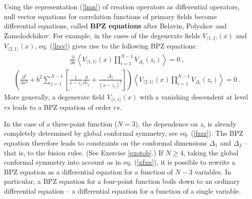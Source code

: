 \documentclass[12pt,a4paper,notitlepage]{report}
\newcommand \la {\left\langle}
\newcommand \ra {\right\rangle}
\newcommand \p {\partial}
\newcommand \pp[1] {{\frac{\p}{\p #1}}}
\numberwithin{equation}{section}
\theoremstyle{break}
\begin{document}
Using the representation (\ref{lmn}) of creation operators as differential operators, null vector equations for correlation functions of primary fields become differential equations, called \textbf{\boldmath BPZ equations} after Belavin, Polyakov and Zamolodchikov. 
For example, in the cases of the degenerate fields $V_{\langle 1,1 \rangle}(x)$ and $V_{\langle 2,1 \rangle}(x)$, eq. (\ref{lrsv}) gives rise to the following BPZ equations: 
\begin{align}
 \pp{x} \la V_{\langle 1,1 \rangle}(x) \prod_{i=1}^{N-1} V_{\Delta_i}(z_i) \ra = 0 \ ,
\label{pvoo} 
\end{align}
\begin{align}
\boxed{\left( \frac{\p^2}{\p x^2}  +b^2 \sum_{j=1}^{N-1} \left[\frac{1}{x-z_j}\pp{z_j}+ \frac{\Delta_j}{(x-z_j)^2} \right]\right)\la V_{\langle 2,1 \rangle}(x) \prod_{i=1}^{N-1} V_{\Delta_i}(z_i) \ra = 0} \ .
\label{pvot}
\end{align}
More generally, a degenerate field $V_{\langle r,s \rangle}(x)$ with a vanishing descendent at level $rs$ leads to a BPZ equation of order $rs$. 

In the case of a three-point function ($N=3$), the dependence on $z_i$ is already completely determined by global conformal symmetry, see eq. (\ref{fzzz}). The BPZ equation therefore leads to constraints on the conformal dimensions $\Delta_1$ and $\Delta_2$ -- that is, to the fusion rules. (See Exercise \ref{exotob}.) If $N\geq 4$, taking the global conformal symmetry into account as in eq. (\ref{xfxn}), it is possible to rewrite a BPZ equation as a differential equation for a function of $N-3$ variables. In particular, a BPZ equation for a four-point function boils down to an ordinary differential equation -- a differential equation for a function of a single variable.  
\end{document}
